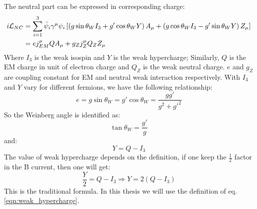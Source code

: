 The neutral part can be expressed in corresponding charge:
\begin{equation}
    \begin{aligned}
	i\mathcal{L}_{NC} &= \sum_{i=1}^{3} \bar{\psi}_i\gamma^\mu\psi_i
	\left[ 
	    \left(g\sin\theta_W I_3 + g'\cos\theta_W Y \right) A_\mu 
	    + \left(g\cos\theta_W I_3 - g'\sin\theta_W Y \right) Z_\mu 
	\right]	\\
	&= ej^\mu_{EM}QA_\mu + g_Zj^\mu_Z Q_Z Z_\mu \\
    \end{aligned}
\end{equation}
Where $I_3$ is the weak isospin and $Y$ is the weak hypercharge; Similarly, $Q$ is
the EM charge in unit of electron charge and $Q_Z$ is the weak neutral charge.
$e$ and $g_Z$ are coupling constant for EM and neutral weak interaction respectively.
With $I_3$ and $Y$ vary for different fermions, we have the following relationship:
\begin{equation}
    e = g\sin\theta_W = g'\cos\theta_W = \frac{gg'}{g^2 + g'^2}
\end{equation}
So the Weinberg angle is identified as:
\begin{equation}
    \tan\theta_W = \frac{g'}{g}
\end{equation}
and: 
\begin{equation}
    Y = Q - I_3
    \label{eqn:weak_hypercharge}
\end{equation}
The value of weak hypercharge depends on the definition, if one keep the $\frac{1}{2}$
factor in the B current, then one will get:
\begin{equation}
    \frac{Y}{2} = Q - I_3   \Rightarrow Y = 2(Q-I_3)
\end{equation}
This is the traditional formula.
In this thesis we will use the definition of eq. \ref{eqn:weak_hypercharge}.

